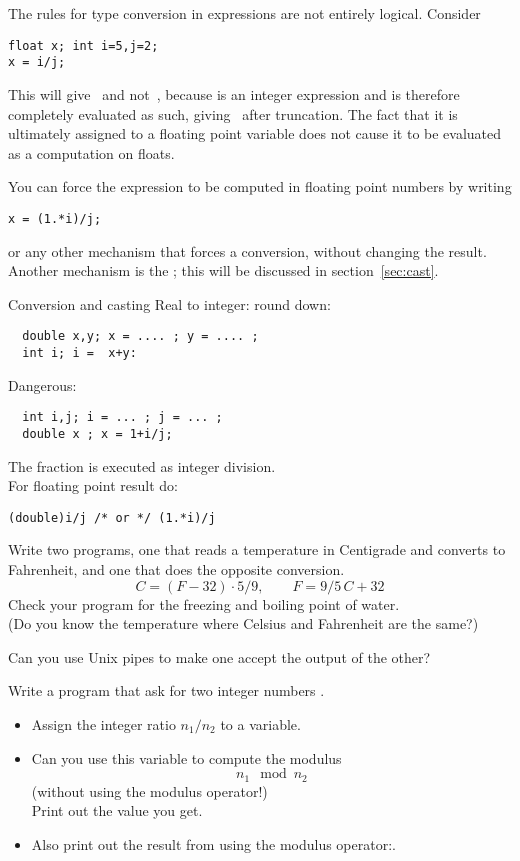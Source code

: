 The rules for type conversion in expressions are not entirely
logical. Consider
\begin{verbatim}
float x; int i=5,j=2;
x = i/j;
\end{verbatim}
This will give~ and not~, because  is an integer
expression and is therefore completely evaluated as such, giving~
after truncation. The fact
that it is ultimately assigned to a floating point variable does not
cause it to be evaluated as a computation on floats.

You can force the expression to be computed in floating point numbers
by writing
\begin{verbatim}
x = (1.*i)/j;
\end{verbatim}
or any other mechanism that forces a conversion, without changing the
result.  Another mechanism is the ; this will be
discussed in section~\ref{sec:cast}.

\begin{slide}{Conversion and casting}
  \label{sl:convert-cast}
  Real to integer: round down:
\begin{verbatim}
  double x,y; x = .... ; y = .... ;
  int i; i =  x+y:
\end{verbatim}
Dangerous:
\begin{verbatim}
  int i,j; i = ... ; j = ... ; 
  double x ; x = 1+i/j;
\end{verbatim}
The fraction is executed as integer division.\\
For floating point result do:
\begin{verbatim}
(double)i/j /* or */ (1.*i)/j
\end{verbatim}
\end{slide}

\begin{exercise}
  \label{ex:C2F}
  Write two programs, one that reads a temperature in Centigrade and
  converts to Fahrenheit, and one that does the opposite conversion.
  \[ C = (F-32)\cdot 5/9,\qquad F = 9/5\,C+32 \]
  Check your program for the freezing and boiling point of water.\\
  (Do you know the temperature where Celsius and Fahrenheit are the
  same?)
  
  Can you use Unix pipes to make one accept the output of the other?
\end{exercise}

\begin{exercise}
  \label{ex:modulus}
  Write a program that ask for two integer numbers .
  \begin{itemize}
  \item Assign the integer ratio $n_1/n_2$ to a variable.
  \item Can you use this variable to compute the modulus
    \[ n_1\mod n_2 \]
    (without using the  modulus operator!)\\
    Print out the value you get.
  \item Also print out the result from using the modulus operator:.
  \end{itemize}
\end{exercise}

